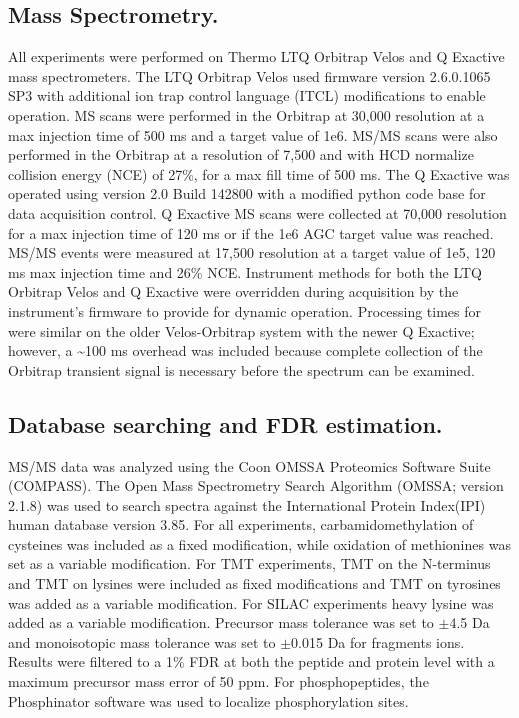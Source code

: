 \subsection{Mass Spectrometry.}
All experiments were performed on Thermo LTQ Orbitrap Velos and Q Exactive mass spectrometers. The LTQ Orbitrap Velos used firmware version 2.6.0.1065 SP3 with additional ion trap control language (ITCL) modifications to enable \inseq{} operation. MS scans were performed in the Orbitrap at 30,000 resolution at a max injection time of 500 ms and a target value of 1e6. MS/MS scans were also performed in the Orbitrap at a resolution of 7,500 and with HCD normalize collision energy (NCE) of 27\%, for a max fill time of 500 ms. The Q Exactive was operated using version 2.0 Build 142800 with a modified python code base for \inseq{} data acquisition control. Q Exactive MS scans were collected at 70,000 resolution for a max injection time of 120 ms or if the 1e6 AGC target value was reached. MS/MS events were measured at 17,500 resolution at a target value of 1e5, 120 ms max injection time and 26\% NCE. Instrument methods for both the LTQ Orbitrap Velos and Q Exactive were overridden during acquisition by the instrument's firmware to provide for dynamic \inseq{} operation. Processing times for \inseq{} were similar on the older Velos-Orbitrap system with the newer Q Exactive; however, a \textasciitilde100 ms overhead was included because complete collection of the Orbitrap transient signal is necessary before the spectrum can be examined.

\subsection{Database searching and FDR estimation.}
MS/MS data was analyzed using the Coon OMSSA Proteomics Software Suite (COMPASS).\cite{compass} The Open Mass Spectrometry Search Algorithm (OMSSA; version 2.1.8) was used to search spectra against the International Protein Index(IPI) human database version 3.85.\cite{omssa} For all experiments, carbamidomethylation of cysteines was included as a fixed modification, while oxidation of methionines was set as a variable modification. For TMT experiments, TMT on the N-terminus and TMT on lysines were included as fixed modifications and TMT on tyrosines was added as a variable modification. For SILAC experiments heavy lysine was added as a variable modification. Precursor mass tolerance was set to $\pm$4.5 Da and monoisotopic mass tolerance was set to $\pm$0.015 Da for fragments ions. Results were filtered to a 1\% FDR at both the peptide and protein level with a maximum precursor mass error of 50 ppm. For phosphopeptides, the Phosphinator software was used to localize phosphorylation sites.\cite{esips}

